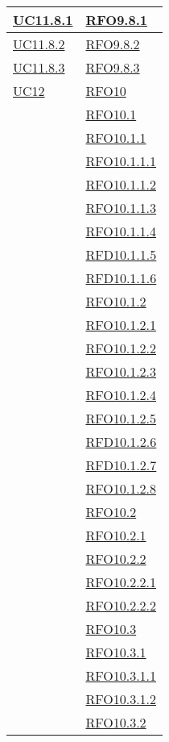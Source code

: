 \begin{longtable}{|>{\centering}m{5cm}|m{5cm}<{\centering}|}
\hyperlink{UC11.8.1}{UC11.8.1} & \hyperlink{RFO9.8.1}{RFO9.8.1}\\\hline
\hyperlink{UC11.8.2}{UC11.8.2} & \hyperlink{RFO9.8.2}{RFO9.8.2}\\\hline
\hyperlink{UC11.8.3}{UC11.8.3} & \hyperlink{RFO9.8.3}{RFO9.8.3}\\\hline

\hyperlink{UC12}{UC12}
& \hyperlink{RFO10}{RFO10}\\
& \hyperlink{RFO10.1}{RFO10.1}\\
& \hyperlink{RFO10.1.1}{RFO10.1.1}\\
& \hyperlink{RFO10.1.1.1}{RFO10.1.1.1}\\
& \hyperlink{RFO10.1.1.2}{RFO10.1.1.2}\\
& \hyperlink{RFO10.1.1.3}{RFO10.1.1.3}\\
& \hyperlink{RFO10.1.1.4}{RFO10.1.1.4}\\
& \hyperlink{RFD10.1.1.5}{RFD10.1.1.5}\\
& \hyperlink{RFD10.1.1.6}{RFD10.1.1.6}\\
& \hyperlink{RFO10.1.2}{RFO10.1.2}\\
& \hyperlink{RFO10.1.2.1}{RFO10.1.2.1}\\
& \hyperlink{RFO10.1.2.2}{RFO10.1.2.2}\\
& \hyperlink{RFO10.1.2.3}{RFO10.1.2.3}\\
& \hyperlink{RFO10.1.2.4}{RFO10.1.2.4}\\
& \hyperlink{RFO10.1.2.5}{RFO10.1.2.5}\\
& \hyperlink{RFD10.1.2.6}{RFD10.1.2.6}\\
& \hyperlink{RFD10.1.2.7}{RFD10.1.2.7}\\
& \hyperlink{RFO10.1.2.8}{RFO10.1.2.8}\\
& \hyperlink{RFO10.2}{RFO10.2}\\
& \hyperlink{RFO10.2.1}{RFO10.2.1}\\
& \hyperlink{RFO10.2.2}{RFO10.2.2}\\
& \hyperlink{RFO10.2.2.1}{RFO10.2.2.1}\\
& \hyperlink{RFO10.2.2.2}{RFO10.2.2.2}\\
& \hyperlink{RFO10.3}{RFO10.3}\\
& \hyperlink{RFO10.3.1}{RFO10.3.1}\\
& \hyperlink{RFO10.3.1.1}{RFO10.3.1.1}\\
& \hyperlink{RFO10.3.1.2}{RFO10.3.1.2}\\
& \hyperlink{RFO10.3.2}{RFO10.3.2}\\

\end{longtable}
